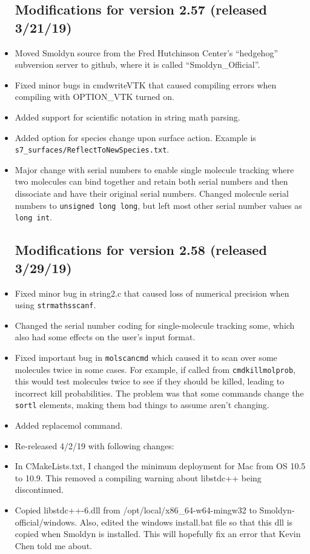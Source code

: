 \documentclass {scrbook}
\newcommand {\ttt} {\texttt}
\begin{document}
\begin{itemize}
\subsection{Modifications for version 2.57 (released 3/21/19)}
\item Moved Smoldyn source from the Fred Hutchinson Center's ``hedgehog'' subversion server to github, where it is called ``Smoldyn\_Official''.
\item Fixed minor bugs in cmdwriteVTK that caused compiling errors when compiling with OPTION\_VTK turned on.
\item Added support for scientific notation in string math parsing.
\item Added option for species change upon surface action. Example is \ttt{s7\_surfaces/ReflectToNewSpecies.txt}.
\item Major change with serial numbers to enable single molecule tracking where two molecules can bind together and retain both serial numbers and then dissociate and have their original serial numbers. Changed molecule serial numbers to \ttt{unsigned long long}, but left most other serial number values as \ttt{long int}.

\subsection{Modifications for version 2.58 (released 3/29/19)}
\item Fixed minor bug in string2.c that caused loss of numerical precision when using \ttt{strmathsscanf}.
\item Changed the serial number coding for single-molecule tracking some, which also had some effects on the user's input format.
\item Fixed important bug in \ttt{molscancmd} which caused it to scan over some molecules twice in some cases. For example, if called from \ttt{cmdkillmolprob}, this would test molecules twice to see if they should be killed, leading to incorrect kill probabilities. The problem was that some commands change the \ttt{sortl} elements, making them bad things to assume aren't changing.
\item Added replacemol command.
\item Re-released 4/2/19 with following changes:
\item In CMakeLists.txt, I changed the minimum deployment for Mac from OS 10.5 to 10.9. This removed a compiling warning about libstdc++ being discontinued.
\item Copied libstdc++-6.dll from /opt/local/x86\_64-w64-mingw32 to Smoldyn-official/windows. Also, edited the windows install.bat file so that this dll is copied when Smoldyn is installed. This will hopefully fix an error that Kevin Chen told me about.


\end{itemize}
\end{document}
